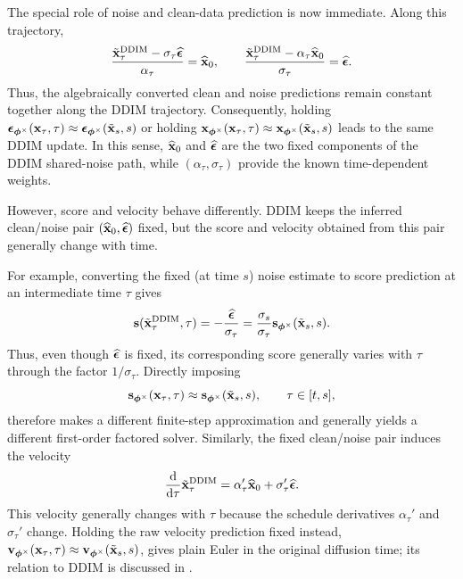 The special role of noise and clean-data prediction is now immediate. Along
this trajectory,
\[
\frac{
\tilde{{\mathbf{x}}}_\tau^{\mathrm{DDIM}}
-
\sigma_\tau\widehat{{\bm{\epsilon}}}
}{
\alpha_\tau
}
=
\widehat{{\mathbf{x}}}_0,
\qquad
\frac{
\tilde{{\mathbf{x}}}_\tau^{\mathrm{DDIM}}
-
\alpha_\tau\widehat{{\mathbf{x}}}_0
}{
\sigma_\tau
}
=
\widehat{{\bm{\epsilon}}}.
\]
Thus, the algebraically converted clean and noise predictions remain constant
together along the DDIM trajectory. Consequently, holding
${\bm{\epsilon}}_{\bm{\phi}^\times}({\mathbf{x}}_\tau,\tau)
\approx{\bm{\epsilon}}_{\bm{\phi}^\times}(\tilde{{\mathbf{x}}}_s,s)$ or holding
${\mathbf{x}}_{\bm{\phi}^\times}({\mathbf{x}}_\tau,\tau)
\approx{\mathbf{x}}_{\bm{\phi}^\times}(\tilde{{\mathbf{x}}}_s,s)$ leads to the same DDIM
update. In this sense, $\widehat{{\mathbf{x}}}_0$ and $\widehat{{\bm{\epsilon}}}$ are the two fixed
components of the DDIM shared-noise path, while
$(\alpha_\tau,\sigma_\tau)$ provide the known time-dependent weights.


However, score and velocity behave differently. DDIM keeps the inferred
clean/noise pair $(\widehat{{\mathbf{x}}}_0,\widehat{{\bm{\epsilon}}})$ fixed, but the score and
velocity obtained from this pair generally change with time.

For example, converting the fixed (at time $s$) noise estimate to score prediction at an
intermediate time $\tau$ gives
\[
{\mathbf{s}}(\tilde{{\mathbf{x}}}_\tau^{\mathrm{DDIM}},\tau)
=
-\frac{\widehat{{\bm{\epsilon}}}}{\sigma_\tau}
=
\frac{\sigma_s}{\sigma_\tau}
{\mathbf{s}}_{\bm{\phi}^\times}(\tilde{{\mathbf{x}}}_s,s).
\]
Thus, even though $\widehat{{\bm{\epsilon}}}$ is fixed, its corresponding score generally
varies with $\tau$ through the factor $1/\sigma_\tau$. Directly imposing
\[
{\mathbf{s}}_{\bm{\phi}^\times}({\mathbf{x}}_\tau,\tau)
\approx
{\mathbf{s}}_{\bm{\phi}^\times}(\tilde{{\mathbf{x}}}_s,s),
\qquad
\tau\in[t,s],
\]
therefore makes a different finite-step approximation and generally yields a
different first-order factored solver. Similarly, the fixed clean/noise pair induces the velocity
\[
\frac{\mathop{}\!\mathrm{d}}{\mathop{}\!\mathrm{d}\tau}
\tilde{{\mathbf{x}}}_\tau^{\mathrm{DDIM}}
=
\alpha_\tau'\widehat{{\mathbf{x}}}_0
+
\sigma_\tau'\widehat{{\bm{\epsilon}}}.
\]
This velocity generally changes with $\tau$ because the schedule derivatives
$\alpha_\tau'$ and $\sigma_\tau'$ change. Holding the raw velocity prediction
fixed instead,
${\mathbf{v}}_{\bm{\phi}^\times}({\mathbf{x}}_\tau,\tau)
\approx
{\mathbf{v}}_{\bm{\phi}^\times}(\tilde{{\mathbf{x}}}_s,s)$,
gives plain Euler in the original diffusion time; its relation to DDIM is
discussed in .




